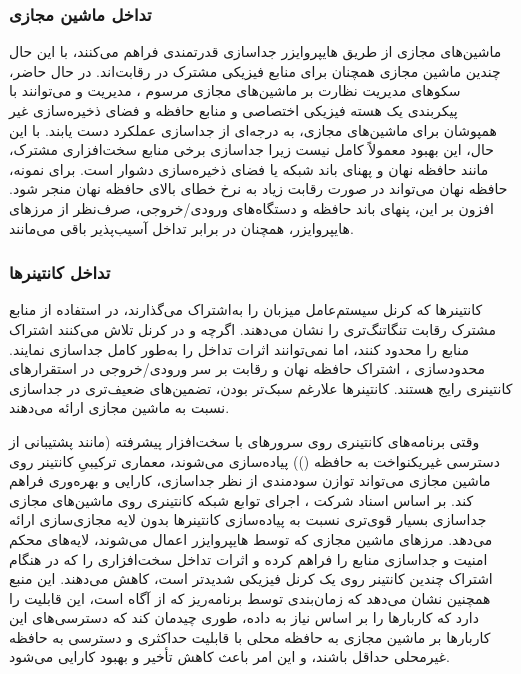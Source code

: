 \subsubsection{تداخل ماشین مجازی}

ماشین‌های مجازی از طریق هایپروایزر جداسازی قدرتمندی فراهم می‌کنند، با این حال چندین ماشین مجازی همچنان برای منابع فیزیکی مشترک در رقابت‌اند. در حال حاضر، سکوهای مدیریت نظارت بر ماشین‌های مجازی مرسوم ، مدیریت  و  می‌توانند با پیکربندی یک هسته فیزیکی اختصاصی و منابع حافظه و فضای ذخیره‌سازی غیر همپوشان برای ماشین‌های مجازی، به درجه‌ای از جداسازی عملکرد دست یابند\cite{barham2003xen}. با این حال، این بهبود معمولاً کامل نیست زیرا جداسازی برخی منابع سخت‌افزاری مشترک، مانند حافظه نهان و پهنای باند شبکه یا فضای ذخیره‌سازی دشوار است. برای نمونه، حافظه نهان  می‌تواند در صورت رقابت زیاد به نرخ خطای بالای حافظه نهان منجر شود. افزون بر این، پنهای باند حافظه و دستگاه‌های ورودی/خروجی، صرف‌نظر از مرزهای هایپروایزر، همچنان در برابر تداخل آسیب‌پذیر باقی می‌مانند.

\subsubsection{تداخل کانتینر‌ها}

کانتینرها که کرنل سیستم‌عامل میزبان را به‌اشتراک می‌گذارند، در استفاده از منابع مشترک رقابت تنگاتنگ‌تری را نشان می‌دهند. اگرچه  و  در کرنل تلاش می‌کنند اشتراک منابع را محدود کنند، اما نمی‌توانند اثرات تداخل را به‌طور کامل جداسازی نمایند. محدودسازی ، اشتراک حافظه نهان و رقابت بر سر ورودی/خروجی در استقرارهای کانتینری  رایج هستند. کانتینرها علارغم سبک‌تر بودن، تضمین‌های ضعیف‌تری در جداسازی نسبت به ماشین مجازی ارائه می‌دهند.

وقتی برنامه‌های کانتینری روی سرورهای  با سخت‌افزار پیشرفته (مانند پشتیبانی از دسترسی غیریکنواخت به حافظه ()) پیاده‌سازی می‌شوند، معماری ترکیبیِ کانتینر روی ماشین مجازی می‌تواند توازن سودمندی از نظر جداسازی، کارایی و بهره‌وری  فراهم کند. بر اساس اسناد شرکت ، اجرای توابع شبکه کانتینری روی ماشین‌های مجازی جداسازی بسیار قوی‌تری نسبت به پیاده‌سازی کانتینرها بدون لایه مجازی‌سازی ارائه می‌دهد\cite{vmware_whitepaper}. مرزهای ماشین مجازی که توسط هایپروایزر اعمال می‌شوند، لایه‌های محکم امنیت و جداسازی منابع را فراهم کرده و اثرات تداخل سخت‌افزاری را که در هنگام اشتراک چندین کانتینر روی یک کرنل فیزیکی شدیدتر است، کاهش می‌دهند. این منبع همچنین نشان می‌دهد که زمان‌بندی  توسط برنامه‌ریز  که از   آگاه است، این قابلیت را دارد که کاربارها را بر اساس نیاز به داده، طوری چیدمان کند که دسترسی‌های این کاربارها بر ماشین‌ مجازی به حافظه محلی با قابلیت  حداکثری و دسترسی به حافظه غیرمحلی حداقل باشند، و این امر باعث کاهش تأخیر و بهبود کارایی می‌شود.

